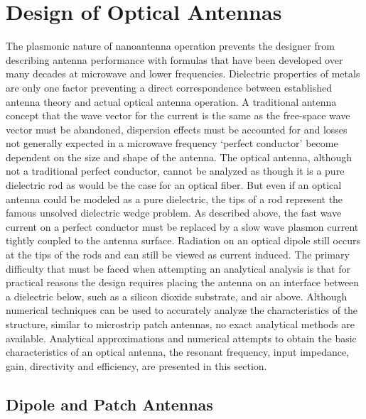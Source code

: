 \documentclass[11pt]{article}
\begin{document}
\section{Design of Optical Antennas}
%
The plasmonic nature of nanoantenna operation prevents the designer from describing antenna performance with formulas that have been developed over many decades at microwave and lower frequencies. Dielectric properties of metals are only one factor preventing a direct correspondence between established antenna theory and actual optical antenna operation. A traditional antenna concept that the wave vector for the current is the same as the free-space wave vector must be abandoned, dispersion effects must be accounted for and losses not generally expected in a microwave frequency  `perfect conductor' become dependent on the size and shape of the antenna.
The optical antenna, although not a traditional perfect conductor, cannot be analyzed as though it is a pure dielectric rod as would be the case for an optical fiber. But even if an optical antenna could be modeled as a pure dielectric, the tips of a rod represent the famous unsolved dielectric wedge problem. As described above, the fast wave current on a perfect conductor must be replaced by a slow wave plasmon current tightly coupled to the antenna surface. Radiation on an optical dipole still occurs at the tips of the rods and can still be viewed as current induced. The primary difficulty that must be faced when attempting an analytical analysis is that for practical reasons the design requires placing the antenna on an interface between a dielectric below, such as a silicon dioxide substrate, and air above. Although numerical techniques can be used to accurately analyze the characteristics of the structure, similar to microstrip patch antennas, no exact analytical methods are available. Analytical approximations and numerical attempts to obtain the basic characteristics of an optical antenna, the resonant frequency, input impedance, gain, directivity and efficiency, are presented in this section.
\subsection{Dipole and Patch Antennas}
\end{document}

